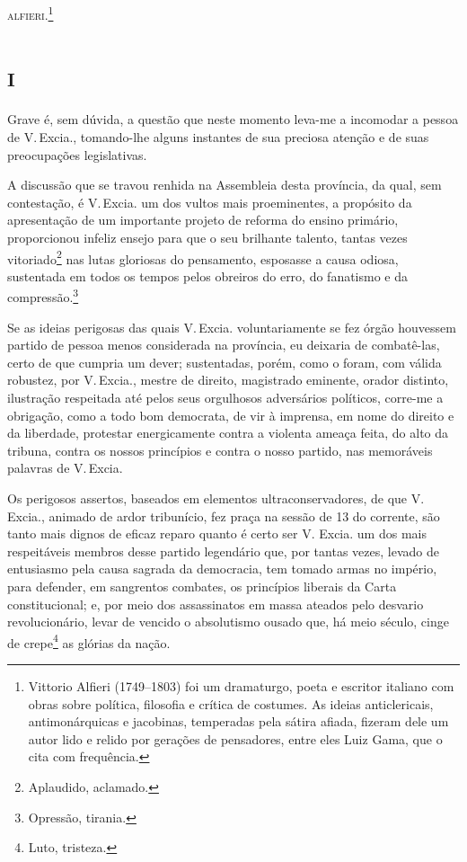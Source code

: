 \textsc{alfieri}.\footnote{Vittorio Alfieri (1749--1803) foi um dramaturgo, poeta
  e escritor italiano com obras sobre política, filosofia e crítica de
  costumes. As ideias anticlericais, antimonárquicas e jacobinas,
  temperadas pela sátira afiada, fizeram dele um autor lido e relido por
  gerações de pensadores, entre eles Luiz Gama, que o cita com
  frequência.\label{alfieri}}

\section{\textsc{i}}

Grave é, sem dúvida, a questão que neste momento leva-me a incomodar a
pessoa de V.\,Excia., tomando-lhe alguns instantes de sua preciosa
atenção e de suas preocupações legislativas.

A discussão que se travou renhida na Assembleia desta província, da
qual, sem contestação, é V.\,Excia. um dos vultos mais proeminentes, a
propósito da apresentação de um importante projeto de reforma do ensino
primário, proporcionou infeliz ensejo para que o seu brilhante talento,
tantas vezes vitoriado\footnote{Aplaudido, aclamado.} nas lutas
gloriosas do pensamento, esposasse a causa odiosa, sustentada em todos
os tempos pelos obreiros do erro, do fanatismo e da
compressão.\footnote{Opressão, tirania.}

Se as ideias perigosas das quais V.\,Excia. voluntariamente se fez órgão
houvessem partido de pessoa menos considerada na província, eu deixaria
de combatê-las, certo de que cumpria um dever; sustentadas, porém, como
o foram, com válida robustez, por V.\,Excia., mestre de direito,
magistrado eminente, orador distinto, ilustração respeitada até pelos
seus orgulhosos adversários políticos, corre-me a obrigação, como a todo
bom democrata, de vir à imprensa, em nome do direito e da liberdade,
protestar energicamente contra a violenta ameaça feita, do alto da
tribuna, contra os nossos princípios e contra o nosso partido, nas
memoráveis palavras de V.\,Excia.

Os perigosos assertos, baseados em elementos ultraconservadores, de que
V.\,Excia., animado de ardor tribunício, fez praça na sessão de 13 do
corrente, são tanto mais dignos de eficaz reparo quanto é certo ser V.
Excia. um dos mais respeitáveis membros desse partido legendário que,
por tantas vezes, levado de entusiasmo pela causa sagrada da democracia,
tem tomado armas no império, para defender, em sangrentos combates, os
princípios liberais da Carta constitucional; e, por meio dos
assassinatos em massa ateados pelo desvario revolucionário, levar de
vencido o absolutismo ousado que, há meio século, cinge de
crepe\footnote{Luto, tristeza.} as glórias da nação.

